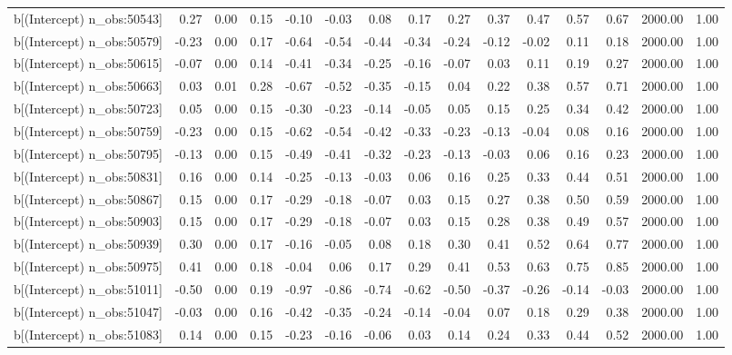 \begin{table}[ht]
\begin{tabular}{rrrrrrrrrrrrrrr}
  b[(Intercept) n\_obs:50543] & 0.27 & 0.00 & 0.15 & -0.10 & -0.03 & 0.08 & 0.17 & 0.27 & 0.37 & 0.47 & 0.57 & 0.67 & 2000.00 & 1.00 \\ 
  b[(Intercept) n\_obs:50579] & -0.23 & 0.00 & 0.17 & -0.64 & -0.54 & -0.44 & -0.34 & -0.24 & -0.12 & -0.02 & 0.11 & 0.18 & 2000.00 & 1.00 \\ 
  b[(Intercept) n\_obs:50615] & -0.07 & 0.00 & 0.14 & -0.41 & -0.34 & -0.25 & -0.16 & -0.07 & 0.03 & 0.11 & 0.19 & 0.27 & 2000.00 & 1.00 \\ 
  b[(Intercept) n\_obs:50663] & 0.03 & 0.01 & 0.28 & -0.67 & -0.52 & -0.35 & -0.15 & 0.04 & 0.22 & 0.38 & 0.57 & 0.71 & 2000.00 & 1.00 \\ 
  b[(Intercept) n\_obs:50723] & 0.05 & 0.00 & 0.15 & -0.30 & -0.23 & -0.14 & -0.05 & 0.05 & 0.15 & 0.25 & 0.34 & 0.42 & 2000.00 & 1.00 \\ 
  b[(Intercept) n\_obs:50759] & -0.23 & 0.00 & 0.15 & -0.62 & -0.54 & -0.42 & -0.33 & -0.23 & -0.13 & -0.04 & 0.08 & 0.16 & 2000.00 & 1.00 \\ 
  b[(Intercept) n\_obs:50795] & -0.13 & 0.00 & 0.15 & -0.49 & -0.41 & -0.32 & -0.23 & -0.13 & -0.03 & 0.06 & 0.16 & 0.23 & 2000.00 & 1.00 \\ 
  b[(Intercept) n\_obs:50831] & 0.16 & 0.00 & 0.14 & -0.25 & -0.13 & -0.03 & 0.06 & 0.16 & 0.25 & 0.33 & 0.44 & 0.51 & 2000.00 & 1.00 \\ 
  b[(Intercept) n\_obs:50867] & 0.15 & 0.00 & 0.17 & -0.29 & -0.18 & -0.07 & 0.03 & 0.15 & 0.27 & 0.38 & 0.50 & 0.59 & 2000.00 & 1.00 \\ 
  b[(Intercept) n\_obs:50903] & 0.15 & 0.00 & 0.17 & -0.29 & -0.18 & -0.07 & 0.03 & 0.15 & 0.28 & 0.38 & 0.49 & 0.57 & 2000.00 & 1.00 \\ 
  b[(Intercept) n\_obs:50939] & 0.30 & 0.00 & 0.17 & -0.16 & -0.05 & 0.08 & 0.18 & 0.30 & 0.41 & 0.52 & 0.64 & 0.77 & 2000.00 & 1.00 \\ 
  b[(Intercept) n\_obs:50975] & 0.41 & 0.00 & 0.18 & -0.04 & 0.06 & 0.17 & 0.29 & 0.41 & 0.53 & 0.63 & 0.75 & 0.85 & 2000.00 & 1.00 \\ 
  b[(Intercept) n\_obs:51011] & -0.50 & 0.00 & 0.19 & -0.97 & -0.86 & -0.74 & -0.62 & -0.50 & -0.37 & -0.26 & -0.14 & -0.03 & 2000.00 & 1.00 \\ 
  b[(Intercept) n\_obs:51047] & -0.03 & 0.00 & 0.16 & -0.42 & -0.35 & -0.24 & -0.14 & -0.04 & 0.07 & 0.18 & 0.29 & 0.38 & 2000.00 & 1.00 \\ 
  b[(Intercept) n\_obs:51083] & 0.14 & 0.00 & 0.15 & -0.23 & -0.16 & -0.06 & 0.03 & 0.14 & 0.24 & 0.33 & 0.44 & 0.52 & 2000.00 & 1.00 \\ 

\end{tabular}
\end{table}
